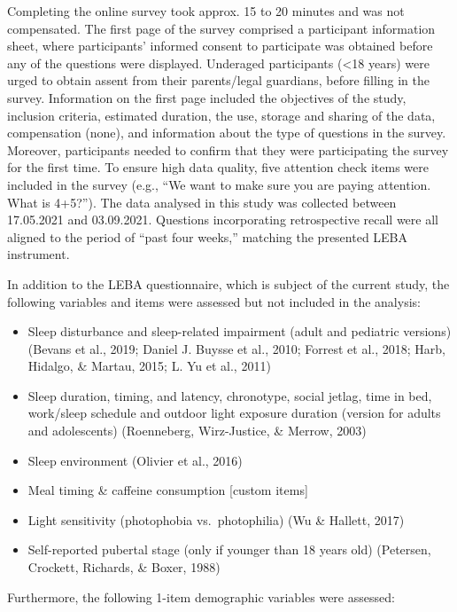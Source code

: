 \documentclass[
  english,
  man]{apa6}
\providecommand{\tightlist}{%
  \setlength{\itemsep}{0pt}\setlength{\parskip}{0pt}}
\begin{document}
Completing the online survey took approx. 15 to 20 minutes and was not compensated. The first page of the survey comprised a participant information sheet, where participants' informed consent to participate was obtained before any of the questions were displayed. Underaged participants (\textless18 years) were urged to obtain assent from their parents/legal guardians, before filling in the survey. Information on the first page included the objectives of the study, inclusion criteria, estimated duration, the use, storage and sharing of the data, compensation (none), and information about the type of questions in the survey. Moreover, participants needed to confirm that they were participating the survey for the first time. To ensure high data quality, five attention check items were included in the survey (e.g., ``We want to make sure you are paying attention. What is 4+5?''). The data analysed in this study was collected between 17.05.2021 and 03.09.2021. Questions incorporating retrospective recall were all aligned to the period of ``past four weeks,'' matching the presented LEBA instrument.

In addition to the LEBA questionnaire, which is subject of the current study, the following variables and items were assessed but not included in the analysis:

\begin{itemize}
\tightlist
\item
  Sleep disturbance and sleep-related impairment (adult and pediatric versions) (Bevans et al., 2019; Daniel J. Buysse et al., 2010; Forrest et al., 2018; Harb, Hidalgo, \& Martau, 2015; L. Yu et al., 2011)
\item
  Sleep duration, timing, and latency, chronotype, social jetlag, time in bed, work/sleep schedule and outdoor light exposure duration (version for adults and adolescents) (Roenneberg, Wirz-Justice, \& Merrow, 2003)
\item
  Sleep environment (Olivier et al., 2016)
\item
  Meal timing \& caffeine consumption {[}custom items{]}
\item
  Light sensitivity (photophobia vs.~photophilia) (Wu \& Hallett, 2017)
\item
  Self-reported pubertal stage (only if younger than 18 years old) (Petersen, Crockett, Richards, \& Boxer, 1988)
\end{itemize}

Furthermore, the following 1-item demographic variables were assessed:
\end{document}
